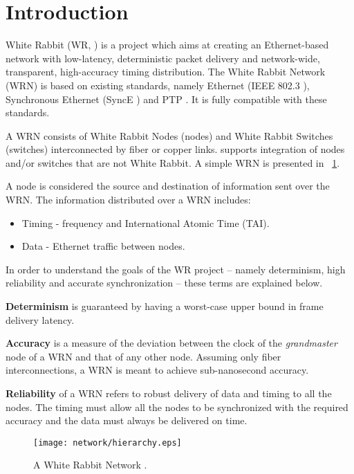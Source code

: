 \section{Introduction}

White Rabbit (WR, \cite{biblio:whiteRabbit}) is a project which aims at creating an
Ethernet-based network with low-latency, deterministic packet delivery
and network-wide, transparent, high-accuracy timing distribution. The
White Rabbit Network (WRN) is based on existing standards, namely
Ethernet (IEEE 802.3 \cite{biblio:IEEE8023}), Synchronous Ethernet
(SyncE \cite{biblio:SynchE}) and PTP \cite{biblio:IEEE1588}. 
It is fully compatible with these standards.

A WRN consists of White Rabbit Nodes (nodes) and White Rabbit Switches
(switches) interconnected by fiber or copper links. 
supports integration of nodes and/or switches that are not White Rabbit. 
A simple WRN is presented in \figurename~\ref{fig:WRnetwork}.

A node is considered the source and destination of information sent
over the WRN. The information distributed over a WRN includes:
\begin{itemize}
   \item  Timing - frequency and International Atomic Time (TAI).
   \item  Data  - Ethernet traffic between nodes.
\end{itemize} 

In order to understand the goals of the WR project -- namely
determinism, high reliability and accurate synchronization -- these
terms are explained below.

\textbf{Determinism} is guaranteed by having a worst-case upper bound
in frame delivery latency.  

\textbf{Accuracy} is a measure of the deviation between the clock of
the \textit{grandmaster} node of a WRN and that of any other node.
Assuming only fiber interconnections, a WRN is meant to achieve
sub-nanosecond accuracy. 

\textbf{Reliability} of a WRN refers to robust delivery of data and
timing to all the nodes.
The timing must allow all the nodes to be
synchronized with the required accuracy and the data must always be
delivered on time.
\begin{figure}[!t]
\centering
\texttt{[image: network/hierarchy.eps]}
\caption{A White Rabbit Network \cite{biblio:TomekMSc}.}
\label{fig:WRnetwork}
\end{figure}

